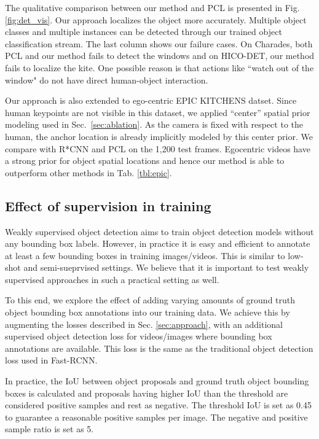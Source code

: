 \documentclass[10pt,twocolumn,letterpaper]{article}
\begin{document}
The qualitative comparison between our method and PCL is presented in Fig. \ref{fig:det_vis}. Our approach localizes the object more accurately. Multiple object classes and multiple instances can be detected through our trained object classification stream. The last column shows our failure cases. On Charades, both PCL \cite{tang2018pcl} and our method fails to detect the windows and on HICO-DET, our method fails to localize the kite. One possible reason is that actions like ``watch out of the window" do not have direct human-object interaction.

Our approach is also extended to ego-centric EPIC KITCHENS datset. Since human keypoints are not visible in this dataset, we applied ``center'' spatial prior modeling used in Sec.~\ref{sec:ablation}. As the camera is fixed with respect to the human, the anchor location is already implicitly modeled by this center prior. We compare with R*CNN \cite{gkioxari2015contextual} and PCL \cite{tang2018pcl} on the 1,200 test frames. Egocentric videos have a strong prior for object spatial locations and hence our method is able to outperform other methods in Tab. \ref{tbl:epic}.

\vspace{-0.5\baselineskip}
\subsection{Effect of supervision in training}
\vspace{-0.4\baselineskip}
\label{sec:supervision}

Weakly supervised object detection aims to train object detection models without any bounding box labels. However, in practice it is easy and efficient to annotate at least a few bounding boxes in training images/videos. This is similar to low-shot and semi-sueprvised settings. We believe that it is important to test weakly supervised approaches in such a practical setting as well.

To this end, we explore the effect of adding varying amounts of ground truth object bounding box annotations into our training data. We achieve this by augmenting the losses described in Sec. \ref{sec:approach}, with an additional supervised object detection loss for videos/images where bounding box annotations are available. This loss is the same as the traditional object detection loss used in Fast-RCNN.

In practice, the IoU between object proposals and ground truth object bounding boxes is calculated and proposals having higher IoU than the threshold are considered positive samples and rest as negative. The threshold IoU is set as 0.45 to guarantee a reasonable positive samples per image. The negative and positive sample ratio is set as 5.
\end{document}
